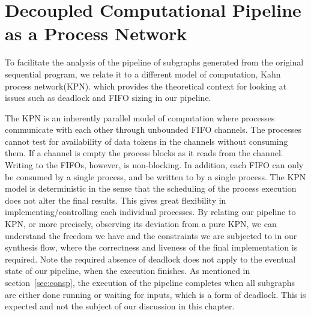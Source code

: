 
\chapter{Decoupled Computational Pipeline as a Process Network}
\label{liveprof}
To facilitate the analysis of the pipeline of subgraphs generated from the original sequential program,
we relate it to a different model of computation, Kahn process network(KPN). which
provides the theoretical context for looking at issues such as deadlock and FIFO sizing in our pipeline. 


The KPN is an inherently
parallel model of computation where processes communicate with
each other through unbounded FIFO channels. 
The processes cannot test for availability of data tokens in 
the channels without consuming them. If a channel is empty
the process blocks as it reads from the channel.
Writing to the FIFOs, however, is non-blocking.
In addition, each FIFO can only be consumed by a single process, and be written to by a single process. The KPN model is deterministic in the sense that the scheduling of
the process execution does not alter the final results. This gives great flexibility
in implementing/controlling each individual processes. 
By relating our pipeline to KPN, or more precisely, observing its deviation from a pure
KPN, we can understand the freedom we have and the constraints we are subjected
to in our synthesis flow, where the correctness and liveness of the final implementation is required. Note the required absence of deadlock does not
apply to the eventual state of our pipeline, when the execution finishes.
As mentioned in section~\ref{sec:consp}, the execution of the pipeline completes when all subgraphs are either done running or waiting for inputs, which is a form of deadlock. This is expected and not the subject of our discussion in this
chapter.




